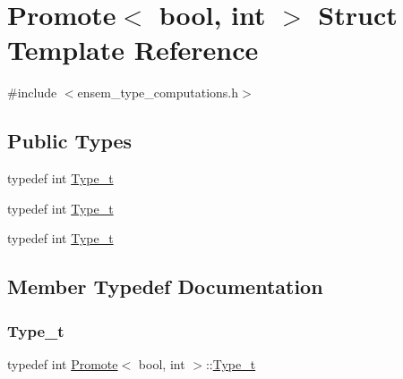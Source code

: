 \hypertarget{structPromote_3_01bool_00_01int_01_4}{}\section{Promote$<$ bool, int $>$ Struct Template Reference}
\label{structPromote_3_01bool_00_01int_01_4}


{\ttfamily \#include $<$ensem\+\_\+type\+\_\+computations.\+h$>$}

\subsection*{Public Types}
\begin{DoxyCompactItemize}
\item 
typedef int \mbox{\hyperlink{structPromote_3_01bool_00_01int_01_4_a7b27a2556c64a5b0f00d0a2fbac26b8a}{Type\+\_\+t}}
\item 
typedef int \mbox{\hyperlink{structPromote_3_01bool_00_01int_01_4_a7b27a2556c64a5b0f00d0a2fbac26b8a}{Type\+\_\+t}}
\item 
typedef int \mbox{\hyperlink{structPromote_3_01bool_00_01int_01_4_a7b27a2556c64a5b0f00d0a2fbac26b8a}{Type\+\_\+t}}
\end{DoxyCompactItemize}


\subsection{Member Typedef Documentation}
\mbox{\label{structPromote_3_01bool_00_01int_01_4_a7b27a2556c64a5b0f00d0a2fbac26b8a}} 
\subsubsection{\texorpdfstring{Type\_t}{Type\_t}\hspace{0.1cm}{\footnotesize\ttfamily [1/3]}}
{\footnotesize\ttfamily typedef int \mbox{\hyperlink{structPromote}{Promote}}$<$ bool, int $>$\+::\mbox{\hyperlink{structPromote_3_01bool_00_01int_01_4_a7b27a2556c64a5b0f00d0a2fbac26b8a}{Type\+\_\+t}}}

\mbox{\label{structPromote_3_01bool_00_01int_01_4_a7b27a2556c64a5b0f00d0a2fbac26b8a}} 

